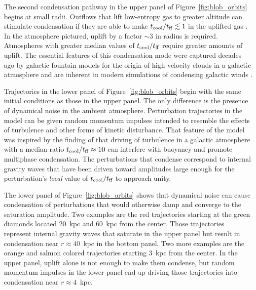 \documentclass[twocolumn]{aastex63}
\begin{document}
The second condensation pathway in the upper panel of Figure~\ref{fig:blob_orbits} begins at small radii.  Outflows that lift low-entropy gas to greater altitude can stimulate condensation if they are able to make $t_{\rm cool} / t_{\rm ff} \lesssim 1$ in the uplifted gas \citep[e.g.,][]{Revaz_2008A&A...477L..33R,LiBryan2014ApJ...789..153L,McNamara_2016ApJ...830...79M,Voit_2017_BigPaper}.  In the atmosphere pictured, uplift by a factor $\sim 3$ in radius is required.  Atmospheres with greater median values of $t_{\rm cool} / t_{\rm ff}$ require greater amounts of uplift.  The essential features of this condensation mode were captured decades ago by galactic fountain models for the origin of high-velocity clouds in a galactic atmosphere \citep{ShapiroField_1976ApJ...205..762S,Bregman_GalacticFountain_1980ApJ...236..577B} and are inherent in modern simulations of condensing galactic winds \citep[e.g.,][]{Vijayan_2018,Schneider_2018ApJ...862...56S}. 

Trajectories in the lower panel of Figure~\ref{fig:blob_orbits} begin with the same initial conditions as those in the upper panel.  The only difference is the presence of dynamical noise in the ambient atmosphere.  Perturbation trajectories in the \citet{Voit_2018ApJ...868..102V} model can be given random momentum impulses intended to resemble the effects of turbulence and other forms of kinetic disturbance.  That feature of the model was inspired by the finding of \citet{Gaspari+2013MNRAS.432.3401G} that driving of turbulence in a galactic atmosphere with a median ratio $t_{\rm cool} / t_{\rm ff} \approx 10$ can interfere with buoyancy and promote multiphase condensation. The perturbations that condense correspond to internal gravity waves that have been driven toward amplitudes large enough for the perturbation's \textit{local} value of $t_{\rm cool} / t_{\rm ff}$ to approach unity.

The lower panel of Figure~\ref{fig:blob_orbits} shows that dynamical noise can cause condensation of perturbations that would otherwise damp and converge to the saturation amplitude.  Two examples are the red trajectories starting at the green diamonds located 20~kpc and 60~kpc from the center.  Those trajectories represent internal gravity waves that saturate in the upper panel but result in condensation near $r \approx 40$~kpc in the bottom panel.  Two more examples are the orange and salmon colored trajectories starting 3~kpc from the center.  In the upper panel, uplift alone is not enough to make them condense, but random momentum impulses in the lower panel end up driving those trajectories into condensation near $r \approx 4$~kpc. 
\end{document}
